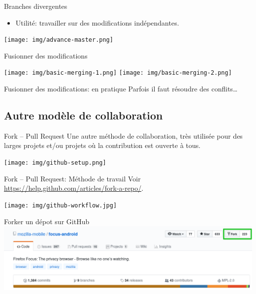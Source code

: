 \documentclass{beamer}
\begin{document}

\begin{frame}{Branches divergentes}
    \begin{itemize}
        \item Utilité: travailler sur des modifications indépendantes.
    \end{itemize}
    \begin{center}
        \texttt{[image: img/advance-master.png]}
    \end{center}
\end{frame}

\begin{frame}{Fusionner des modifications}
    \begin{center}
        \texttt{[image: img/basic-merging-1.png]}
        \texttt{[image: img/basic-merging-2.png]}
    \end{center}
\end{frame}

\begin{frame}{Fusionner des modifications: en pratique}
    Parfois il faut résoudre des conflits\dots
\end{frame}


\subsection{Autre modèle de collaboration}

\begin{frame}{Fork -- Pull Request}
    Une autre méthode de collaboration, très utilisée pour des larges projets
    et/ou projets o\`u la contribution est ouverte à tous.
    \begin{center}
        \texttt{[image: img/github-setup.png]}
    \end{center}
\end{frame}

\begin{frame}{Fork -- Pull Request: Méthode de travail}
    Voir \url{https://help.github.com/articles/fork-a-repo/}.
    \begin{center}
        \texttt{[image: img/github-workflow.jpg]}
    \end{center}
\end{frame}

\begin{frame}{Forker un dépot sur GitHub}
    \includegraphics[scale=0.30]{img/github_desktop/fork.png}
\end{frame}
\end{document}
